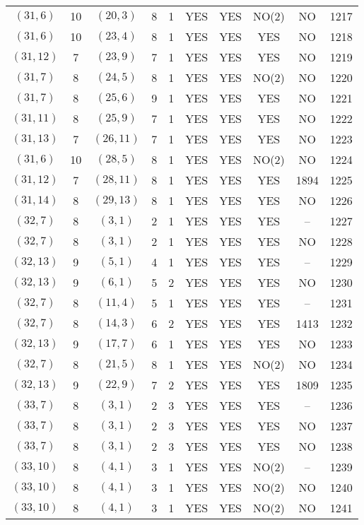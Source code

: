 \begin{longtable}{|c|c|c|c|c|c|c|c|c|c|}
$(31, 6)$ & 10 & $(20, 3)$ & 8 & 1 & YES & YES & NO(2) & NO & 1217\\
$(31, 6)$ & 10 & $(23, 4)$ & 8 & 1 & YES & YES & YES & NO & 1218\\
$(31, 12)$ & 7 & $(23, 9)$ & 7 & 1 & YES & YES & YES & NO & 1219\\
$(31, 7)$ & 8 & $(24, 5)$ & 8 & 1 & YES & YES & NO(2) & NO & 1220\\
$(31, 7)$ & 8 & $(25, 6)$ & 9 & 1 & YES & YES & YES & NO & 1221\\
$(31, 11)$ & 8 & $(25, 9)$ & 7 & 1 & YES & YES & YES & NO & 1222\\
$(31, 13)$ & 7 & $(26, 11)$ & 7 & 1 & YES & YES & YES & NO & 1223\\
$(31, 6)$ & 10 & $(28, 5)$ & 8 & 1 & YES & YES & NO(2) & NO & 1224\\
$(31, 12)$ & 7 & $(28, 11)$ & 8 & 1 & YES & YES & YES & 1894 & 1225\\
$(31, 14)$ & 8 & $(29, 13)$ & 8 & 1 & YES & YES & YES & NO & 1226\\
$(32, 7)$ & 8 & $(3, 1)$ & 2 & 1 & YES & YES & YES & -- & 1227\\
$(32, 7)$ & 8 & $(3, 1)$ & 2 & 1 & YES & YES & YES & NO & 1228\\
$(32, 13)$ & 9 & $(5, 1)$ & 4 & 1 & YES & YES & YES & -- & 1229\\
$(32, 13)$ & 9 & $(6, 1)$ & 5 & 2 & YES & YES & YES & NO & 1230\\
$(32, 7)$ & 8 & $(11, 4)$ & 5 & 1 & YES & YES & YES & -- & 1231\\
$(32, 7)$ & 8 & $(14, 3)$ & 6 & 2 & YES & YES & YES & 1413 & 1232\\
$(32, 13)$ & 9 & $(17, 7)$ & 6 & 1 & YES & YES & YES & NO & 1233\\
$(32, 7)$ & 8 & $(21, 5)$ & 8 & 1 & YES & YES & NO(2) & NO & 1234\\
$(32, 13)$ & 9 & $(22, 9)$ & 7 & 2 & YES & YES & YES & 1809 & 1235\\
$(33, 7)$ & 8 & $(3, 1)$ & 2 & 3 & YES & YES & YES & -- & 1236\\
$(33, 7)$ & 8 & $(3, 1)$ & 2 & 3 & YES & YES & YES & NO & 1237\\
$(33, 7)$ & 8 & $(3, 1)$ & 2 & 3 & YES & YES & YES & NO & 1238\\
$(33, 10)$ & 8 & $(4, 1)$ & 3 & 1 & YES & YES & NO(2) & -- & 1239\\
$(33, 10)$ & 8 & $(4, 1)$ & 3 & 1 & YES & YES & NO(2) & NO & 1240\\
$(33, 10)$ & 8 & $(4, 1)$ & 3 & 1 & YES & YES & NO(2) & NO & 1241\\

\end{longtable}
